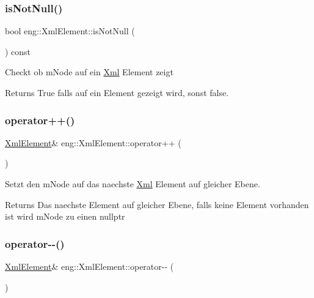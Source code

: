 \subsubsection{\texorpdfstring{is\+Not\+Null()}{isNotNull()}}
{\footnotesize\ttfamily bool eng\+::\+Xml\+Element\+::is\+Not\+Null (\begin{DoxyParamCaption}{ }\end{DoxyParamCaption}) const\hspace{0.3cm}{\ttfamily [inline]}}

Checkt ob m\+Node auf ein \hyperlink{classeng_1_1_xml}{Xml} Element zeigt \begin{DoxyReturn}{Returns}
True falls auf ein Element gezeigt wird, sonst false. 
\end{DoxyReturn}
\mbox{\label{classeng_1_1_xml_element_a68253afd7af7d8690cc22bc85c005308}} 
\subsubsection{\texorpdfstring{operator++()}{operator++()}}
{\footnotesize\ttfamily \hyperlink{classeng_1_1_xml_element}{Xml\+Element}\& eng\+::\+Xml\+Element\+::operator++ (\begin{DoxyParamCaption}{ }\end{DoxyParamCaption})\hspace{0.3cm}{\ttfamily [inline]}}

Setzt den m\+Node auf das naechste \hyperlink{classeng_1_1_xml}{Xml} Element auf gleicher Ebene. \begin{DoxyReturn}{Returns}
Das naechste Element auf gleicher Ebene, falls keine Element vorhanden ist wird m\+Node zu einen nullptr 
\end{DoxyReturn}
\mbox{\label{classeng_1_1_xml_element_a11472f3e2b4f8226058a5fcba89c2d2a}} 
\subsubsection{\texorpdfstring{operator-\/-\/()}{operator--()}}
{\footnotesize\ttfamily \hyperlink{classeng_1_1_xml_element}{Xml\+Element}\& eng\+::\+Xml\+Element\+::operator-\/-\/ (\begin{DoxyParamCaption}{ }\end{DoxyParamCaption})\hspace{0.3cm}{\ttfamily [inline]}}


